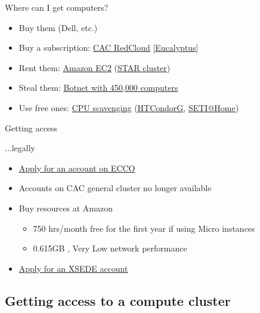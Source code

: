 \documentclass[xcolor=table,compress]{beamer}
\begin{document}
\begin{frame}{Where can I get computers?}
\begin{itemize}
\item Buy them (Dell, etc.)
\item Buy a subscription: \href{http://www.cac.cornell.edu/RedCloud/}{CAC RedCloud} [\href{http://www.eucalyptus.com/}{Eucalyptus}]
\item Rent them: \href{http://docs.aws.amazon.com/AWSEC2/latest/UserGuide/using-spot-instances-cluster.html}{Amazon EC2} (\href{http://star.mit.edu/cluster/docs/latest/quickstart.html}{STAR cluster})
\item Steal them: \href{http://en.wikipedia.org/wiki/Srizbi_botnet}{Botnet with 450,000 computers}
\item Use free ones: \href{http://en.wikipedia.org/wiki/CPU_scavenging}{CPU scavenging} \newline(\href{http://en.wikipedia.org/wiki/HTCondor}{HTCondorG}, \href{http://setiathome.berkeley.edu/}{SETI@Home})
\end{itemize}
\end{frame}

\begin{frame}{Getting access}
\begin{block}{...legally}
\begin{itemize}
\item \href{http://www2.vrdc.cornell.edu/news/ecco/step-1-requesting-an-ecco-account/}{Apply for an account on ECCO}
\item Accounts on CAC general cluster no longer available
\item Buy resources at Amazon 
\begin{itemize}
\item 750 hrs/month free for the first year if using Micro instances
\item 0.615GB	, Very Low network performance
\end{itemize}
\item \href{https://www.xsede.org/using-xsede\#step3}{Apply for an XSEDE account}
\end{itemize}
\end{block}
\end{frame}

\subsection{Getting access to a compute cluster}
\end{document}

